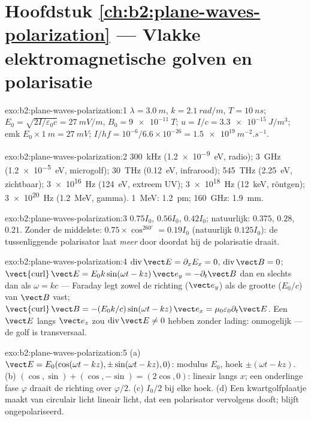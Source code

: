 \section*{Hoofdstuk \ref{ch:b2:plane-waves-polarization} --- Vlakke
elektromagnetische golven en polarisatie}

\begin{solution}{exo:b2:plane-waves-polarization:1}
$\lambda = \qty{3.0}{m}$, $k = \qty{2.1}{rad/m}$, $T = \qty{10}{ns}$;
$E_0 = \sqrt{2I/\varepsilon_0c}
= \qty{27}{mV/m}$, $B_0 = \qty{9e-11}{T}$;
$u = I/c = \qty{3.3e-15}{J/m^3}$; emk
$E_0 \times \qty{1}{m} = \qty{27}{mV}$;
$I/hf = 10^{-6}/6.6 \times 10^{-26} = \qty{1.5e19}{m^{-2}.s^{-1}}$.
\end{solution}

\begin{solution}{exo:b2:plane-waves-polarization:2}
\qty{300}{kHz} (\qty{1.2e-9}{eV}, radio); \qty{3}{GHz} (\qty{1.2e-5}{eV},
microgolf); \qty{30}{THz} (\qty{0.12}{eV}, infrarood); \qty{545}{THz}
(\qty{2.25}{eV}, zichtbaar); \qty{3e16}{Hz} (\qty{124}{eV}, extreem UV);
\qty{3e18}{Hz} (\qty{12}{keV}, röntgen); \qty{3e20}{Hz} (\qty{1.2}{MeV},
gamma). \qty{1}{MeV}: \qty{1.2}{pm}; \qty{160}{GHz}: \qty{1.9}{mm}.
\end{solution}

\begin{solution}{exo:b2:plane-waves-polarization:3}
$0.75I_0$, $0.56I_0$, $0.42I_0$; natuurlijk: $0.375$, $0.28$, $0.21$. Zonder
de middelste: $0.75 \times \cos^260^\circ = 0.19I_0$ (natuurlijk
$0.125I_0$): de tussenliggende polarisator laat \emph{meer} door doordat hij
de polarisatie draait.
\end{solution}

\begin{solution}{exo:b2:plane-waves-polarization:4}
$\operatorname{div}\vect E = \partial_xE_x = 0$,
$\operatorname{div}\vect B = 0$;
$\operatorname{\vect{curl}}\vect E = E_0k\sin(\omega t - kz)\,\vect e_y = -\partial_t\vect B$
dan en slechts dan als $\omega =
kc$ --- Faraday legt zowel de richting
($\vect e_y$) als de grootte ($E_0/c$) van $\vect B$ vast;
$\operatorname{\vect{curl}}\vect B = -(E_0k/c)\sin(\omega t - kz)\,\vect e_x
= \mu_0\varepsilon_0\partial_t\vect E$.
Een $\vect E$ langs $\vect e_z$ zou $\operatorname{div}
\vect E \ne 0$
hebben zonder lading: onmogelijk --- de golf is transversaal.
\end{solution}

\begin{solution}{exo:b2:plane-waves-polarization:5}
(a) $\vect E = E_0(\cos(\omega t - kz), \pm\sin(\omega t - kz), 0)$: modulus
$E_0$, hoek $\pm(\omega t - kz)$. (b)
$(\cos, \sin) + (\cos, -\sin) = (2\cos, 0)$: lineair langs $x$; een
onderlinge fase $\varphi$ draait de richting over $\varphi/2$. (c) $I_0/2$
bij elke hoek. (d) Een kwartgolfplaatje maakt van circulair licht lineair
licht, dat een polarisator vervolgens dooft;  blijft
ongepolariseerd.
\end{solution}

